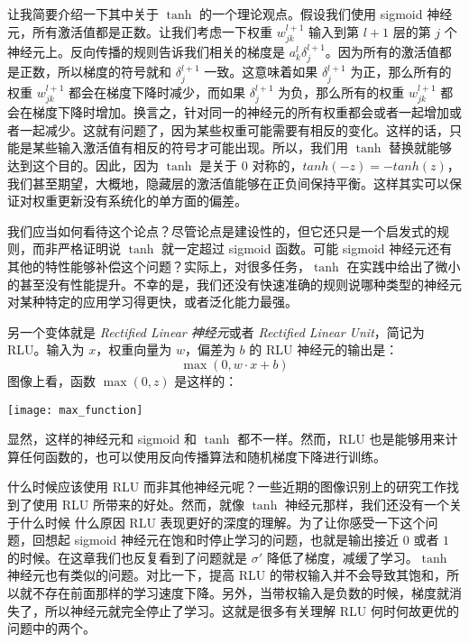 让我简要介绍一下其中关于 $\tanh$ 的一个理论观点。假设我们使用 sigmoid 神经元，所有激活值都是正数。让我们考虑一下权重 $w_{jk}^{l+1}$ 输入到第 $l+1$ 层的第 $j$ 个神经元上。反向传播的规则告诉我们相关的梯度是 $a_k^l\delta_j^{l+1}$。因为所有的激活值都是正数，所以梯度的符号就和 $\delta_j^{l+1}$ 一致。这意味着如果 $\delta_j^{l+1}$ 为正，那么所有的权重 $w_{jk}^{l+1}$ 都会在梯度下降时减少，而如果 $\delta_j^{l+1}$ 为负，那么所有的权重 $w_{jk}^{l+1}$ 都会在梯度下降时增加。换言之，针对同一的神经元的所有权重都会或者一起增加或者一起减少。这就有问题了，因为某些权重可能需要有相反的变化。这样的话，只能是某些输入激活值有相反的符号才可能出现。所以，我们用 $\tanh$ 替换就能够达到这个目的。因此，因为 $\tanh$ 是关于 $0$ 对称的，$tanh(-z)=-tanh(z)$，我们甚至期望，大概地，隐藏层的激活值能够在正负间保持平衡。这样其实可以保证对权重更新没有系统化的单方面的偏差。

我们应当如何看待这个论点？尽管论点是建设性的，但它还只是一个启发式的规则，而非严格证明说 $\tanh$ 就一定超过 sigmoid 函数。可能 sigmoid 神经元还有其他的特性能够补偿这个问题？实际上，对很多任务，$\tanh$ 在实践中给出了微小的甚至没有性能提升。不幸的是，我们还没有快速准确的规则说哪种类型的神经元对某种特定的应用学习得更快，或者泛化能力最强。

另一个变体就是 \emph{Rectified Linear 神经元}或者 \emph{Rectified Linear Unit}，简记为 RLU。输入为 $x$，权重向量为 $w$，偏差为 $b$ 的 RLU 神经元的输出是：
\begin{equation}
  \max(0, w \cdot x+b)
  \label{eq:112}\tag{112}
\end{equation}
图像上看，函数 $\max(0,z)$ 是这样的：
\begin{center}
  \texttt{[image: max\_function]}
\end{center}

显然，这样的神经元和 sigmoid 和 $\tanh$ 都不一样。然而，RLU 也是能够用来计算任何函数的，也可以使用反向传播算法和随机梯度下降进行训练。

什么时候应该使用 RLU 而非其他神经元呢？一些近期的图像识别上的研究工作找到了使用 RLU 所带来的好处。然而，就像 $\tanh$ 神经元那样，我们还没有一个关于什么时候 什么原因 RLU 表现更好的深度的理解。为了让你感受一下这个问题，回想起 sigmoid 神经元在饱和时停止学习的问题，也就是输出接近 $0$ 或者 $1$ 的时候。在这章我们也反复看到了问题就是 $\sigma'$ 降低了梯度，减缓了学习。$\tanh$ 神经元也有类似的问题。对比一下，提高 RLU 的带权输入并不会导致其饱和，所以就不存在前面那样的学习速度下降。另外，当带权输入是负数的时候，梯度就消失了，所以神经元就完全停止了学习。这就是很多有关理解 RLU 何时何故更优的问题中的两个。

